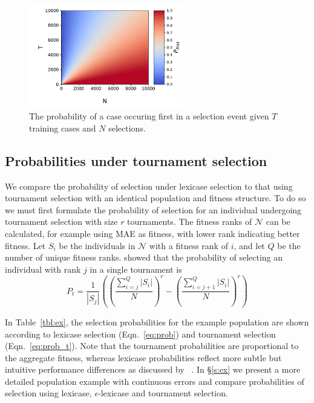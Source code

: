 \documentclass[twoside]{article}
\begin{document}
\begin{figure}
\centering
  \includegraphics[width = 0.6\textwidth]{figs/prob_case_first_heatmap.pdf}
  \caption{The probability of a case occuring first in a selection event given $T$ training cases and $N$ selections.}\label{fig:prob_first}
\end{figure}

\subsection{Probabilities under tournament selection} We compare the probability of selection under lexicase selection to that using tournament selection with an identical population and fitness structure. To do so we must first formulate the probability of selection for an individual undergoing tournament selection with size $r$ tournaments. The fitness ranks of $\mathcal{N}$ can be calculated, for example using MAE as fitness, with lower rank indicating better fitness. Let $S_i$ be the individuals in $\mathcal{N}$ with a fitness rank of $i$, and let $Q$ be the number of unique fitness ranks. \cite{xie_another_2007} showed that the probability of selecting an individual with rank $j$ in a single tournament is
\begin{equation}\label{eq:prob_t}
P_t = \frac{1}{|S_j|}\left( \left(\frac{\sum_{i=j}^Q{|S_i|}}{N}\right)^r - \left(\frac{\sum_{i=j+1}^Q{|S_i|}}{N}\right)^r \right)
\end{equation}

In Table~\ref{tbl:ex}, the selection probabilities for the example population are shown according to lexicase selection (Eqn.~\ref{eq:prob}) and tournament selection (Eqn.~\ref{eq:prob_t}). Note that the tournament probabilities are proportional to the aggregate fitness, whereas lexicase probabilities reflect more subtle but intuitive performance differences as discussed by ~\cite{spector_assessment_2012}. In \S\ref{s:ex} we present a more detailed population example with continuous errors and compare probabilities of selection using lexicase, $\epsilon$-lexicase and tournament selection. 
\end{document}
